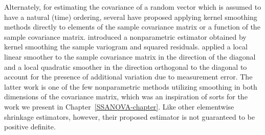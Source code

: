 \bigskip

Alternately, for estimating the covariance of a random vector which is assumed to have a natural (time) ordering, several have proposed applying kernel smoothing methods directly to elements of the sample covariance matrix or a function of the sample covariance matrix. \cite{zeger1994semiparametric} introduced a nonparametric estimator obtained by kernel smoothing the sample variogram and squared residuals.  \cite{yao2005functional} applied a local linear smoother to the sample covariance matrix in the direction of the diagonal and a local quadratic smoother in the direction orthogonal to the diagonal to account for the presence of additional variation due to measurement error. The latter work is one of the few nonparametric methods utilizing smoothing in both dimensions of the covariance matrix, which was an inspiration of sorts for the work we present in Chapter~\ref{SSANOVA-chapter}. Like other elementwise shrinkage estimators, however, their proposed estimator is not guaranteed to be positive definite. 

\bigskip

